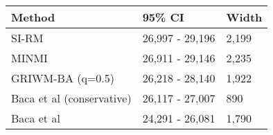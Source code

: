 
\begin{tabular}{lll}
\toprule
Method & 95\% CI & Width\\
\midrule
SI-RM & 26,997 - 29,196 & 2,199\\
MINMI & 26,911 - 29,146 & 2,235\\
GRIWM-BA (q=0.5) & 26,218 - 28,140 & 1,922\\
Baca et al (conservative) & 26,117 - 27,007 & 890\\
Baca et al & 24,291 - 26,081 & 1,790\\
\bottomrule
\end{tabular}
